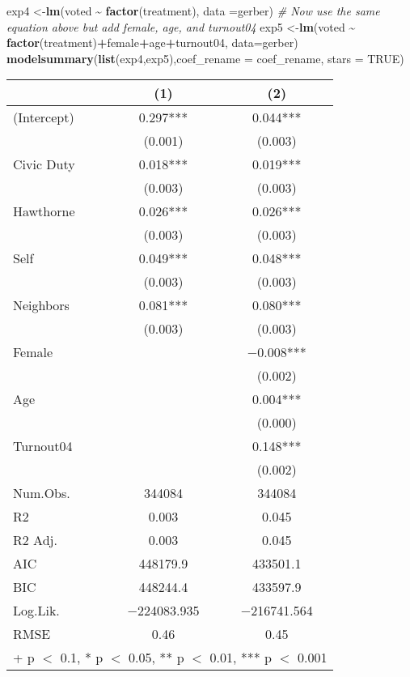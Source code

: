 \documentclass[
]{article}
\newenvironment{Shaded}{\begin{snugshade}}{\end{snugshade}}
\newcommand{\AttributeTok}[1]{\textcolor[rgb]{0.13,0.29,0.53}{#1}}
\newcommand{\CommentTok}[1]{\textcolor[rgb]{0.56,0.35,0.01}{\textit{#1}}}
\newcommand{\ConstantTok}[1]{\textcolor[rgb]{0.56,0.35,0.01}{#1}}
\newcommand{\FunctionTok}[1]{\textcolor[rgb]{0.13,0.29,0.53}{\textbf{#1}}}
\newcommand{\NormalTok}[1]{#1}
\newcommand{\OtherTok}[1]{\textcolor[rgb]{0.56,0.35,0.01}{#1}}
\newcommand{\SpecialCharTok}[1]{\textcolor[rgb]{0.81,0.36,0.00}{\textbf{#1}}}
\begin{document}
\begin{Shaded}
\begin{Highlighting}[]
\NormalTok{exp4 }\OtherTok{\textless{}{-}}\FunctionTok{lm}\NormalTok{(voted }\SpecialCharTok{\textasciitilde{}} \FunctionTok{factor}\NormalTok{(treatment), }\AttributeTok{data =}\NormalTok{gerber)}
\CommentTok{\# Now use the same equation above but add female, age, and turnout04}
\NormalTok{exp5 }\OtherTok{\textless{}{-}}\FunctionTok{lm}\NormalTok{(voted }\SpecialCharTok{\textasciitilde{}} \FunctionTok{factor}\NormalTok{(treatment)}\SpecialCharTok{+}\NormalTok{female}\SpecialCharTok{+}\NormalTok{age}\SpecialCharTok{+}\NormalTok{turnout04, }\AttributeTok{data=}\NormalTok{gerber)}
\FunctionTok{modelsummary}\NormalTok{(}\FunctionTok{list}\NormalTok{(exp4,exp5),}\AttributeTok{coef\_rename =}\NormalTok{ coef\_rename, }\AttributeTok{stars =} \ConstantTok{TRUE}\NormalTok{)}
\end{Highlighting}
\end{Shaded}

\begin{table}
\centering
\begin{tabular}[t]{lcc}
\toprule
  & (1) & (2)\\
\midrule
(Intercept) & \num{0.297}*** & \num{0.044}***\\
 & (\num{0.001}) & (\num{0.003})\\
Civic Duty & \num{0.018}*** & \num{0.019}***\\
 & (\num{0.003}) & \vphantom{3} (\num{0.003})\\
Hawthorne & \num{0.026}*** & \num{0.026}***\\
 & (\num{0.003}) & \vphantom{2} (\num{0.003})\\
Self & \num{0.049}*** & \num{0.048}***\\
 & (\num{0.003}) & \vphantom{1} (\num{0.003})\\
Neighbors & \num{0.081}*** & \num{0.080}***\\
 & (\num{0.003}) & (\num{0.003})\\
Female &  & \num{-0.008}***\\
 &  & \vphantom{1} (\num{0.002})\\
Age &  & \num{0.004}***\\
 &  & (\num{0.000})\\
Turnout04 &  & \num{0.148}***\\
 &  & (\num{0.002})\\
\midrule
Num.Obs. & \num{344084} & \num{344084}\\
R2 & \num{0.003} & \num{0.045}\\
R2 Adj. & \num{0.003} & \num{0.045}\\
AIC & \num{448179.9} & \num{433501.1}\\
BIC & \num{448244.4} & \num{433597.9}\\
Log.Lik. & \num{-224083.935} & \num{-216741.564}\\
RMSE & \num{0.46} & \num{0.45}\\
\bottomrule
\multicolumn{3}{l}{\rule{0pt}{1em}+ p $<$ 0.1, * p $<$ 0.05, ** p $<$ 0.01, *** p $<$ 0.001}\\
\end{tabular}
\end{table}
\end{document}
